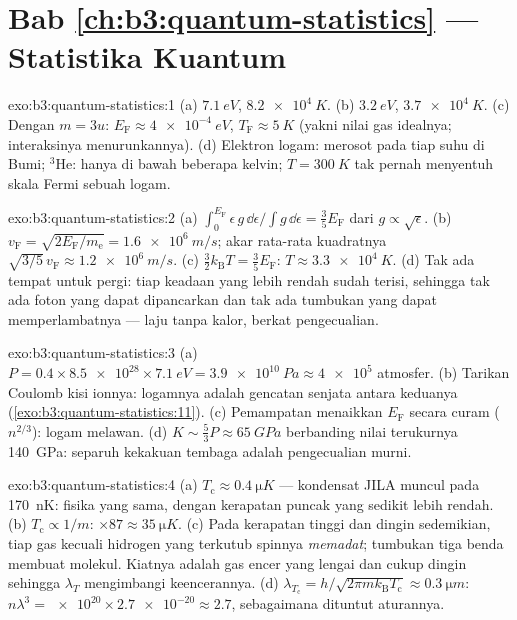 \section*{Bab \ref{ch:b3:quantum-statistics} --- Statistika Kuantum}

\begin{solution}{exo:b3:quantum-statistics:1}
(a) $\qty{7.1}{eV}$, $\qty{8.2e4}{K}$. (b) $\qty{3.2}{eV}$,
$\qty{3.7e4}{K}$. (c) Dengan $m = 3u$: $E_{\text{F}} \approx
\qty{4e-4}{eV}$, $T_{\text{F}} \approx \qty{5}{K}$ (yakni nilai gas
idealnya; interaksinya menurunkannya). (d) Elektron logam: merosot pada
tiap suhu di Bumi; $^3$He: hanya di bawah beberapa kelvin;
$T = \qty{300}{K}$ tak pernah menyentuh skala Fermi sebuah logam.
\end{solution}

\begin{solution}{exo:b3:quantum-statistics:2}
(a) $\int_0^{E_{\text{F}}}\epsilon\,g\,\dd\epsilon/\int g\,\dd
\epsilon = \tfrac35 E_{\text{F}}$ dari $g \propto \sqrt\epsilon$.
(b) $v_{\text{F}} = \sqrt{2E_{\text{F}}/m_{\text{e}}} =
\qty{1.6e6}{m/s}$; akar rata-rata kuadratnya $\sqrt{3/5}\,v_{\text{F}} \approx
\qty{1.2e6}{m/s}$. (c) $\tfrac32 k_{\text{B}}T = \tfrac35
E_{\text{F}}$: $T \approx \qty{3.3e4}{K}$. (d) Tak ada tempat untuk
pergi: tiap keadaan yang lebih rendah sudah terisi, sehingga tak ada foton
yang dapat dipancarkan dan tak ada tumbukan yang dapat memperlambatnya
--- laju tanpa kalor, berkat pengecualian.
\end{solution}

\begin{solution}{exo:b3:quantum-statistics:3}
(a) $P = 0.4 \times \num{8.5e28} \times \qty{7.1}{eV} =
\qty{3.9e10}{Pa} \approx \num{4e5}$ atmosfer. (b) Tarikan Coulomb
kisi ionnya: logamnya adalah gencatan senjata antara
keduanya (\cref{exo:b3:quantum-statistics:11}). (c) Pemampatan menaikkan
$E_{\text{F}}$ secara curam ($n^{2/3}$): logam melawan. (d) $K \sim
\tfrac53 P \approx \qty{65}{GPa}$ berbanding nilai terukurnya
\qty{140}{GPa}: separuh kekakuan tembaga adalah pengecualian murni.
\end{solution}

\begin{solution}{exo:b3:quantum-statistics:4}
(a) $T_{\text{c}} \approx \qty{0.4}{\micro K}$ --- kondensat JILA
muncul pada \qty{170}{nK}: fisika yang sama, dengan kerapatan puncak
yang sedikit lebih rendah. (b) $T_{\text{c}} \propto 1/m$: $\times87 \approx
\qty{35}{\micro K}$. (c) Pada kerapatan tinggi dan dingin sedemikian,
tiap gas kecuali hidrogen yang terkutub spinnya \emph{memadat};
tumbukan tiga benda membuat molekul. Kiatnya adalah gas encer yang
lengai dan cukup dingin sehingga $\lambda_T$ mengimbangi keencerannya. (d)
$\lambda_{T_{\text{c}}} = h/\sqrt{2\pi mk_{\text{B}}T_{\text{c}}}
\approx \qty{0.3}{\micro m}$: $n\lambda^3 = \num{e20} \times
\num{2.7e-20} \approx 2.7$, sebagaimana dituntut aturannya.
\end{solution}

